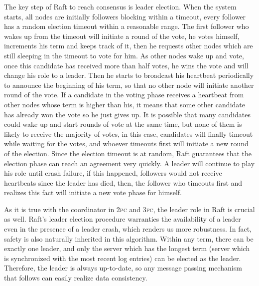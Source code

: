 \documentclass[11pt]{article}
\begin{document}
    The key step of Raft to reach consensus is leader election. When the system starts, all nodes are initially followers blocking within a timeout, every follower has a random election timeout within a reasonable range. The first follower who wakes up from the timeout will initiate a round of the vote, he votes himself, increments his term and keeps track of it, then he requests other nodes which are still sleeping in the timeout to vote for him. As other nodes wake up and vote, once this candidate has received more than half votes, he wins the vote and will change his role to a leader. Then he starts to broadcast his heartbeat periodically to announce the beginning of his term, so that no other node will initiate another round of the vote. If a candidate in the voting phase receives a heartbeat from other nodes whose term is higher than his, it means that some other candidate has already won the vote so he just gives up. It is possible that many candidates could wake up and start rounds of vote at the same time, but none of them is likely to receive the majority of votes, in this case, candidates will finally timeout while waiting for the votes, and whoever timeouts first will initiate a new round of the election. Since the election timeout is at random, Raft guarantees that the election phase can reach an agreement very quickly. A leader will continue to play his role until crash failure, if this happened, followers would not receive heartbeats since the leader has died, then, the follower who timeouts first and realizes this fact will initiate a new vote phase for himself.

    As it is true with the coordinator in \textsc{2pc} and \textsc{3pc}, the leader role in Raft is crucial as well. Raft's leader election procedure warranties the availability of a leader even in the presence of a leader crash, which renders us more robustness. In fact, safety is also naturally inherited in this algorithm. Within any term, there can be exactly one leader, and only the server which has the longest term (server which is synchronized with the most recent log entries) can be elected as the leader. Therefore, the leader is always up-to-date, so any message passing mechanism that follows can easily realize data consistency.
\end{document}
